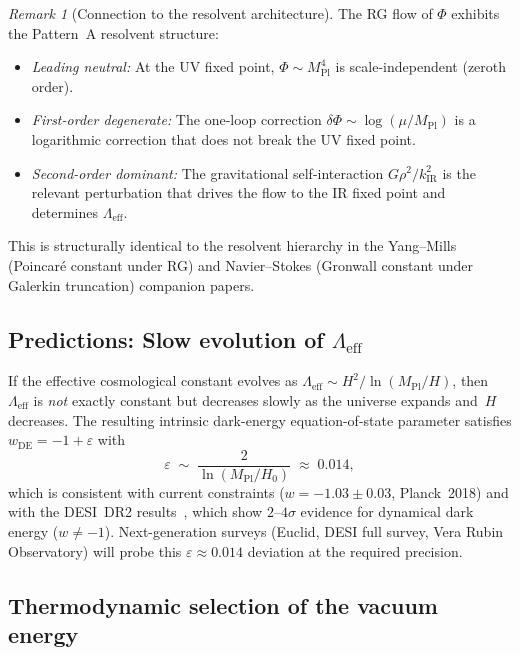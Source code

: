 \documentclass[12pt,a4paper]{article}
\theoremstyle{definition}
\theoremstyle{plain}
\theoremstyle{remark}
\newtheorem{remark}[definition]{Remark}
\newcommand{\Leff}{\Lambda_{\mathrm{eff}}}
\begin{document}
\begin{remark}[Connection to the resolvent architecture]
\label{rem:rg-resolvent}
The RG flow of $\Phi$ exhibits the Pattern~A resolvent structure:
\begin{itemize}
\item \emph{Leading neutral:}
  At the UV fixed point, $\Phi \sim M_{\mathrm{Pl}}^{4}$ is
  scale-independent (zeroth order).
\item \emph{First-order degenerate:}
  The one-loop correction
  $\delta\Phi \sim \log(\mu/M_{\mathrm{Pl}})$ is a logarithmic
  correction that does not break the UV fixed point.
\item \emph{Second-order dominant:}
  The gravitational self-interaction $G\rho^{2}/k_{\mathrm{IR}}^{2}$
  is the relevant perturbation that drives the flow to the IR fixed
  point and determines $\Lambda_{\mathrm{eff}}$.
\end{itemize}
This is structurally identical to the resolvent hierarchy in the
Yang--Mills (Poincar\'e constant under RG) and Navier--Stokes
(Gronwall constant under Galerkin truncation) companion papers.
\end{remark}

\subsection{Predictions: Slow evolution of $\Leff$}

If the effective cosmological constant evolves as
$\Leff \sim H^{2}/\ln(M_{\mathrm{Pl}}/H)$, then $\Leff$ is
\emph{not} exactly constant but decreases slowly as the universe
expands and~$H$ decreases.  The resulting intrinsic dark-energy
equation-of-state parameter satisfies $w_{\mathrm{DE}} = -1 + \varepsilon$ with
\begin{equation}
  \varepsilon \;\sim\;
  \frac{2}{\ln(M_{\mathrm{Pl}}/H_0)}
  \;\approx\; 0.014,
\end{equation}
which is consistent with current constraints
($w = -1.03 \pm 0.03$, Planck~2018) and with the DESI~DR2
results~\cite{DESI2025}, which show $2$--$4\sigma$ evidence for
dynamical dark energy ($w \neq -1$).  Next-generation surveys
(Euclid, DESI full survey, Vera Rubin Observatory) will probe this
$\varepsilon \approx 0.014$ deviation at the required precision.

\subsection{Thermodynamic selection of the vacuum energy}\label{sec:selection}
\end{document}
